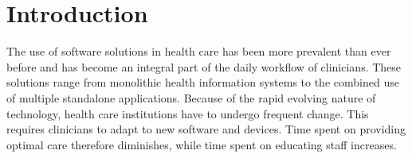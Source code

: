 \section{Introduction}

The use of software solutions in health care has been more prevalent than ever before and has become an integral part of the daily workflow of clinicians. These solutions range from monolithic health information systems to the combined use of multiple standalone applications. Because of the rapid evolving nature of technology, health care institutions have to undergo frequent change. This requires clinicians to adapt to new software and devices. Time spent on providing optimal care therefore diminishes, while time spent on educating staff increases.



